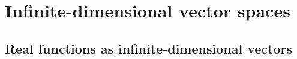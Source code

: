 \chapter{Infinite-dimensional vector spaces}
\section{Real functions as infinite-dimensional vectors}

